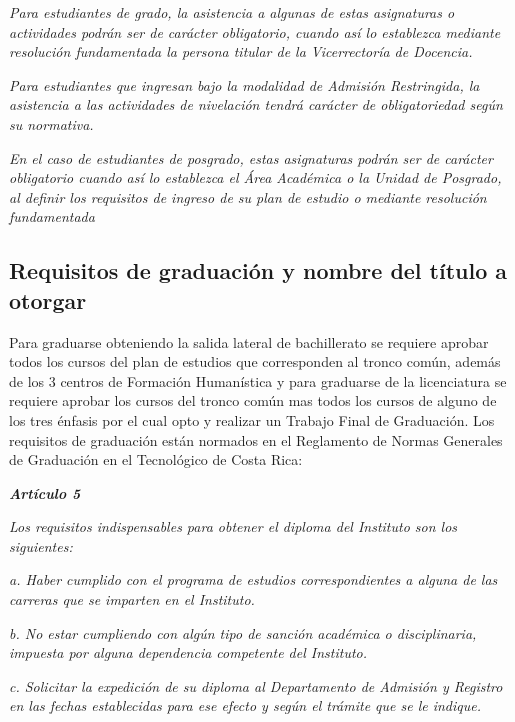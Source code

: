 \textit{Para estudiantes de grado, la asistencia a algunas de estas asignaturas o actividades podrán ser de carácter obligatorio, cuando así lo establezca mediante resolución fundamentada la persona titular de la Vicerrectoría de Docencia.}\par

\textit{Para estudiantes que ingresan bajo la modalidad de Admisión Restringida, la asistencia a las actividades de nivelación tendrá carácter de obligatoriedad según su normativa.  }\par

\textit{En el caso de estudiantes de posgrado, estas asignaturas podrán ser de carácter obligatorio cuando así lo establezca el Área Académica o la Unidad de Posgrado, al definir los requisitos de ingreso de su plan de estudio o mediante resolución fundamentada}\par

\subsection*{Requisitos de graduación y nombre del título a otorgar}

Para graduarse obteniendo la salida lateral de bachillerato se requiere aprobar todos los cursos del plan de estudios que corresponden al tronco común, además de los 3 centros de Formación Humanística y para graduarse de la licenciatura se requiere aprobar los cursos del tronco común mas todos los cursos de alguno de los tres énfasis por el cual opto y realizar un Trabajo Final de Graduación. Los requisitos de graduación están normados en el Reglamento de Normas Generales de Graduación en el Tecnológico de Costa Rica:\par

\textit{\textbf{Artículo 5}}\par

\textit{Los requisitos indispensables para obtener el diploma del Instituto son los siguientes:}\par

\textit{a. Haber cumplido con el programa de estudios correspondientes a alguna de las carreras que se imparten en el Instituto.}\par

\textit{b. No estar cumpliendo con algún tipo de sanción académica o disciplinaria, impuesta por alguna dependencia competente del Instituto.}\par

\textit{c. Solicitar la expedición de su diploma al Departamento de Admisión y Registro en las fechas establecidas para ese efecto y según el trámite que se le indique.}\par

